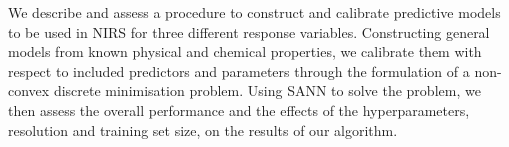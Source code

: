 We describe and assess a procedure to construct and calibrate predictive models to be used in NIRS for three different response variables.
Constructing general models from known physical and chemical properties, we calibrate them with respect to included predictors and parameters through the formulation of a non-convex discrete minimisation problem.
Using SANN to solve the problem, we then assess the overall performance and the effects of the hyperparameters, resolution and training set size, on the results of our algorithm.
